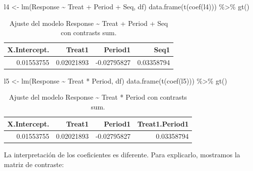 \documentclass[
  12pt,
  a4paper,
  extrafontsizes,
  onecolumn,
  openright,
  table]{memoir}
\newenvironment{Shaded}{\begin{snugshade}}{\end{snugshade}}
\newcommand{\FunctionTok}[1]{\textcolor[rgb]{0.28,0.35,0.67}{#1}}
\newcommand{\NormalTok}[1]{\textcolor[rgb]{0.00,0.23,0.31}{#1}}
\newcommand{\OtherTok}[1]{\textcolor[rgb]{0.00,0.23,0.31}{#1}}
\newcommand{\SpecialCharTok}[1]{\textcolor[rgb]{0.37,0.37,0.37}{#1}}
\begin{document}
\scriptsize

\begin{Shaded}
\begin{Highlighting}[]
\NormalTok{l4 }\OtherTok{\textless{}{-}} \FunctionTok{lm}\NormalTok{(Response }\SpecialCharTok{\textasciitilde{}}\NormalTok{ Treat }\SpecialCharTok{+}\NormalTok{ Period }\SpecialCharTok{+}\NormalTok{ Seq, df)}
\FunctionTok{data.frame}\NormalTok{(}\FunctionTok{t}\NormalTok{(}\FunctionTok{coef}\NormalTok{(l4))) }\SpecialCharTok{\%\textgreater{}\%} \FunctionTok{gt}\NormalTok{()}
\end{Highlighting}
\end{Shaded}

\hypertarget{tbl-l4}{}
\begin{longtable}{rrrr}
\caption{\label{tbl-l4}Ajuste del modelo Response \textasciitilde{} Treat + Period + Seq con
contrasts sum. }\tabularnewline

\toprule
X.Intercept. & Treat1 & Period1 & Seq1 \\ 
\midrule
0.01553755 & 0.02021893 & -0.02795827 & 0.03358794 \\ 
\bottomrule
\end{longtable}

\normalsize

\scriptsize

\begin{Shaded}
\begin{Highlighting}[]
\NormalTok{l5 }\OtherTok{\textless{}{-}} \FunctionTok{lm}\NormalTok{(Response }\SpecialCharTok{\textasciitilde{}}\NormalTok{ Treat }\SpecialCharTok{*}\NormalTok{ Period, df)}
\FunctionTok{data.frame}\NormalTok{(}\FunctionTok{t}\NormalTok{(}\FunctionTok{coef}\NormalTok{(l5))) }\SpecialCharTok{\%\textgreater{}\%} \FunctionTok{gt}\NormalTok{()}
\end{Highlighting}
\end{Shaded}

\hypertarget{tbl-l5}{}
\begin{longtable}{rrrr}
\caption{\label{tbl-l5}Ajuste del modelo Response \textasciitilde{} Treat * Period con
contrasts sum. }\tabularnewline

\toprule
X.Intercept. & Treat1 & Period1 & Treat1.Period1 \\ 
\midrule
0.01553755 & 0.02021893 & -0.02795827 & 0.03358794 \\ 
\bottomrule
\end{longtable}

\normalsize

La interpretación de los coeficientes es diferente. Para explicarlo,
mostramos la matriz de contraste:
\end{document}
